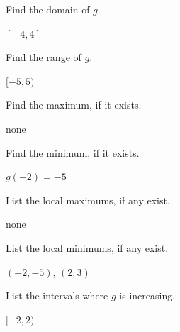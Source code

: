 \documentclass{ximera}
\begin{document}
\begin{question}
\begin{problem}\label{usesecondfuncgraphfirst}
Find the domain of $g$.
\begin{solution}
$[-4,4]$
\end{solution}

\end{problem}

\begin{problem}
Find the range of $g$.

\begin{solution}
$[-5,5)$
\end{solution}

\end{problem}

\begin{problem}
Find the maximum, if it exists.
\begin{solution}
none

\end{solution}

\end{problem}

\begin{problem}
Find the minimum, if it exists. 

\begin{solution}
$g(-2) = -5$
\end{solution}

\end{problem}

\begin{problem}
List the local maximums, if any exist.
\begin{solution}
none
\end{solution}

\end{problem}

\begin{problem}
List the local minimums, if any exist.

\begin{solution}
$(-2,-5)$, $(2,3)$

\end{solution}

\end{problem}

\begin{problem}
List the intervals where $g$ is increasing.
\begin{solution}
$[-2,2)$
\end{solution}

\end{problem}


\end{question}
\end{document}
